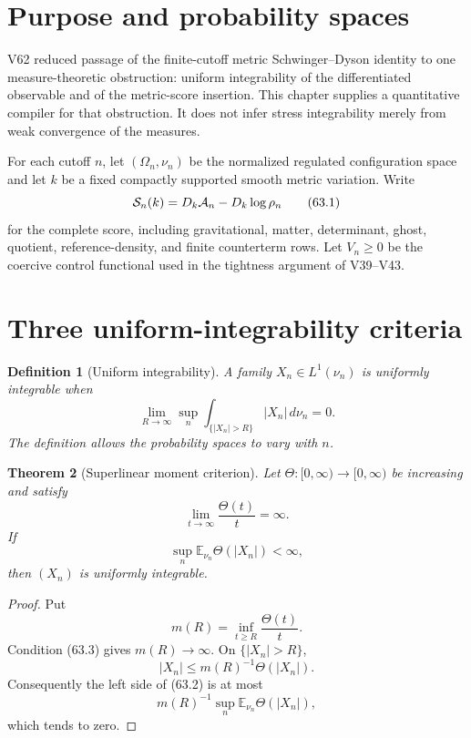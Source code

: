 \documentclass[11pt]{article}
\newtheorem{theorem}{Theorem}[section]
\newtheorem{definition}[theorem]{Definition}
\theoremstyle{remark}
\begin{document}
\section{Purpose and probability spaces}

V62 reduced passage of the finite-cutoff metric
Schwinger--Dyson identity to one measure-theoretic obstruction:
uniform integrability of the differentiated observable and of the
metric-score insertion.  This chapter supplies a quantitative
compiler for that obstruction.  It does not infer stress
integrability merely from weak convergence of the measures.

For each cutoff \(n\), let \((\Omega_n,\nu_n)\) be the normalized
regulated configuration space and let \(k\) be a fixed compactly
supported smooth metric variation.  Write
\[
 {\cal S}_n(k)
 =
 D_k{\cal A}_n-D_k\log\rho_n                         \tag{63.1}
\]
for the complete score, including gravitational, matter,
determinant, ghost, quotient, reference-density, and finite
counterterm rows.  Let \(V_n\geq 0\) be the coercive control
functional used in the tightness argument of V39--V43.

\section{Three uniform-integrability criteria}

\begin{definition}[Uniform integrability]
\label{def:v15v63-ui}
A family \(X_n\in L^1(\nu_n)\) is uniformly integrable when
\[
 \lim_{R\to\infty}\sup_n
 \int_{\{|X_n|>R\}}|X_n|\,d\nu_n=0.                  \tag{63.2}
\]
The definition allows the probability spaces to vary with \(n\).
\end{definition}

\begin{theorem}[Superlinear moment criterion]
\label{thm:v15v63-dvp}
Let \(\Theta:[0,\infty)\to[0,\infty)\) be increasing and satisfy
\[
 \lim_{t\to\infty}\frac{\Theta(t)}{t}=\infty.         \tag{63.3}
\]
If
\[
 \sup_n\mathbb E_{\nu_n}\Theta(|X_n|)<\infty,         \tag{63.4}
\]
then \((X_n)\) is uniformly integrable.
\end{theorem}

\begin{proof}
Put
\[
 m(R)=\inf_{t\geq R}\frac{\Theta(t)}{t}.
\]
Condition (63.3) gives \(m(R)\to\infty\).  On
\(\{|X_n|>R\}\),
\[
 |X_n|\leq m(R)^{-1}\Theta(|X_n|).
\]
Consequently the left side of (63.2) is at most
\[
 m(R)^{-1}\sup_n\mathbb E_{\nu_n}\Theta(|X_n|),
\]
which tends to zero.
\end{proof}
\end{document}
